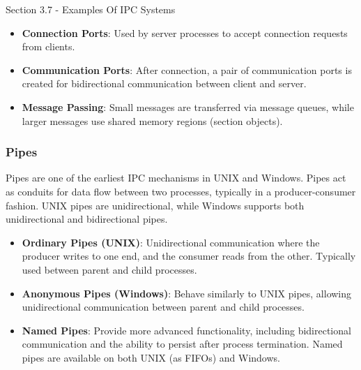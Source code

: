 \begin{notes}{Section 3.7 - Examples Of IPC Systems}
\begin{highlight}
        \begin{itemize}
            \item \textbf{Connection Ports}: Used by server processes to accept connection requests from clients.
            \item \textbf{Communication Ports}: After connection, a pair of communication ports is created for bidirectional communication between client and server.
            \item \textbf{Message Passing}: Small messages are transferred via message queues, while larger messages use shared memory regions (section objects).
        \end{itemize}
    
    \end{highlight}
    
    \subsubsection*{Pipes}
    
    Pipes are one of the earliest IPC mechanisms in UNIX and Windows. Pipes act as conduits for data flow between two processes, typically in a producer-consumer fashion. UNIX pipes are unidirectional, 
    while Windows supports both unidirectional and bidirectional pipes.
    
    \begin{highlight}[Pipes]
    
        \begin{itemize}
            \item \textbf{Ordinary Pipes (UNIX)}: Unidirectional communication where the producer writes to one end, and the consumer reads from the other. Typically used between parent and child processes.
            \item \textbf{Anonymous Pipes (Windows)}: Behave similarly to UNIX pipes, allowing unidirectional communication between parent and child processes.
            \item \textbf{Named Pipes}: Provide more advanced functionality, including bidirectional communication and the ability to persist after process termination. Named pipes are available on 
            both UNIX (as FIFOs) and Windows.
        \end{itemize}
    
    \end{highlight}
    
    \begin{highlight}
    

\end{highlight}
\end{notes}

